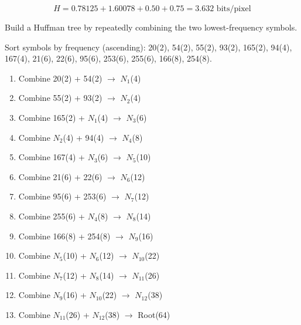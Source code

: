 \documentclass[12pt]{article}
\begin{document}
\begin{resultsbox}
\[
\boxed{H = 0.78125 + 1.60078 + 0.50 + 0.75 = 3.632 \text{ bits/pixel}}
\]
\end{resultsbox}


\vspace{0.4cm}

\begin{stepbox}
Build a Huffman tree by repeatedly combining the two lowest-frequency symbols.

Sort symbols by frequency (ascending): 20(2), 54(2), 55(2), 93(2), 165(2), 94(4), 167(4), 21(6), 22(6), 95(6), 253(6), 255(6), 166(8), 254(8).

\begin{enumerate}[label=\arabic*.]
\item Combine 20(2) + 54(2) $\to$ $N_1$(4)
\item Combine 55(2) + 93(2) $\to$ $N_2$(4)
\item Combine 165(2) + $N_1$(4) $\to$ $N_3$(6)
\item Combine $N_2$(4) + 94(4) $\to$ $N_4$(8)
\item Combine 167(4) + $N_3$(6) $\to$ $N_5$(10)
\item Combine 21(6) + 22(6) $\to$ $N_6$(12)
\item Combine 95(6) + 253(6) $\to$ $N_7$(12)
\item Combine 255(6) + $N_4$(8) $\to$ $N_8$(14)
\item Combine 166(8) + 254(8) $\to$ $N_9$(16)
\item Combine $N_5$(10) + $N_6$(12) $\to$ $N_{10}$(22)
\item Combine $N_7$(12) + $N_8$(14) $\to$ $N_{11}$(26)
\item Combine $N_9$(16) + $N_{10}$(22) $\to$ $N_{12}$(38)
\item Combine $N_{11}$(26) + $N_{12}$(38) $\to$ Root(64)
\end{enumerate}
\end{stepbox}
\end{document}
